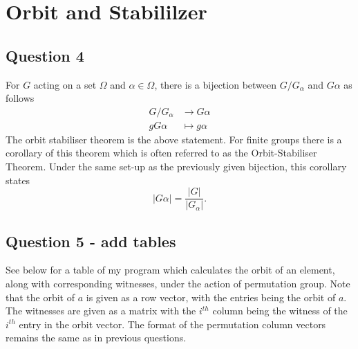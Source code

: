\documentclass{article}
\begin{document}
\section{Orbit and Stabililzer}
\subsection{Question 4}
 For $G$ acting on a set $\Omega$ and $\alpha\in \Omega$,  there is a bijection between $G/G_\alpha$ and $G\alpha$ as follows
\begin{align*}
	G/G_\alpha &\to G\alpha \\
	gG\alpha &\mapsto g\alpha
\end{align*} 
The orbit stabiliser theorem is the above statement.  For finite groups there is a corollary of this theorem which is often referred to as the Orbit-Stabiliser Theorem.  Under the same set-up as the previously given bijection,  this corollary states
\[ |G\alpha|=\frac{|G|}{|G_\alpha|}.\]

\subsection{Question 5 - add tables}
See below for a table of my program which calculates the orbit of an element, along with corresponding witnesses, under the action of permutation group.  Note that the orbit of $a$ is given as a row vector,  with the entries being the orbit of $a$. The witnesses are given as a matrix with the $i^{th}$ column being the witness of the $i^{th}$ entry in the orbit vector.  The format of the permutation column vectors remains the same as in previous questions.
\end{document}

